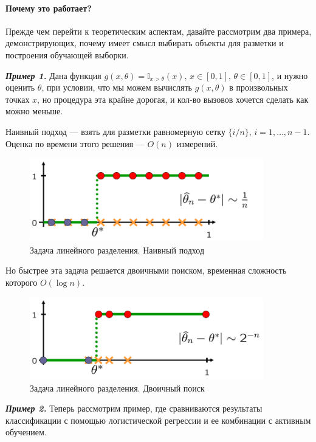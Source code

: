 \documentclass[specialist, 12pt, href]{article}
\begin{document}
\paragraph{Почему это
работает?}

Прежде чем перейти к теоретическим аспектам, давайте рассмотрим два
примера, демонстрирующих, почему имеет смысл выбирать объекты для
разметки и построения обучающей выборки.

\emph{\textbf{Пример 1.}} Дана функция
\(g(x, \theta) = \mathbb{I}_{x > \theta}(x),\, x \in [0, 1],\, \theta \in [0, 1]\),
и нужно оценить \(\theta\), при условии, что мы можем вычислять
\(g(x, \theta)\) в произвольных точках \(x\), но процедура эта крайне
дорогая, и кол-во вызовов хочется сделать как можно меньше.

Наивный подход --- взять для разметки равномерную сетку
\(\{i/n\},\, i = 1,\ldots, n - 1\). Оценка по времени этого решения ---
\(O(n)\) измерений.

\begin{figure}[htbp]
\centering
\includegraphics[width=4in]{img/naive.png}
\caption{Задача линейного разделения. Наивный подход}
\end{figure}

Но быстрее эта задача решается двоичными поиском, временная сложность
которого \(O(\log n)\).

\begin{figure}[htbp]
\centering
\includegraphics[width=4in]{img/bs.png}
\caption{Задача линейного разделения. Двоичный поиск}
\end{figure}

\emph{\textbf{Пример 2.}} Теперь рассмотрим пример, где сравниваются
результаты классификации с помощью логистической регрессии и ее
комбинации с активным обучением.
\end{document}
